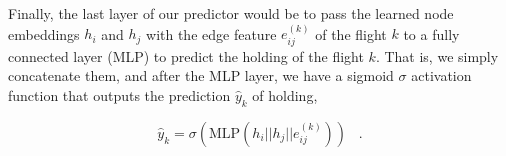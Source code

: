 

Finally, the last layer of our predictor would be to pass the learned node embeddings $h_i$ and $h_j$ with the edge feature $e_{ij}^{(k)}$ of the flight $k$ to a fully connected layer (MLP) to predict the holding of the flight $k$.   That is, we simply concatenate them, and after the MLP layer, we have a sigmoid $\sigma$ activation function that outputs the prediction $\hat{y}_k$ of holding,

$$ \hat{y}_k = \sigma (\text{MLP}(h_i || h_j || e_{ij}^{(k)})) \; \; \; \text{.} $$